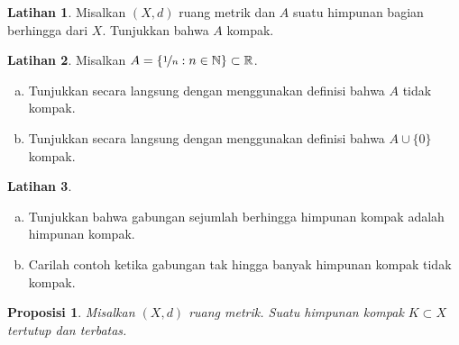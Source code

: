 \documentclass[12pt,openany]{book}
\newcommand{\R}{{\mathbb{R}}}
\newcommand{\N}{{\mathbb{N}}}
\theoremstyle{plain}
\newtheorem{prop}[thm]{Proposisi}
\theoremstyle{remark}
\theoremstyle{definition}
\newenvironment{exbox}{%
    \def\FrameCommand{\vrule width 1pt \relax\hspace{10pt}}%
    \MakeFramed{\advance\hsize-\width\FrameRestore}%
}{%
    \endMakeFramed
}
\newenvironment{exparts}{%
    \leavevmode\begin{enumerate}[a),noitemsep,topsep=0pt,parsep=0pt,partopsep=0pt]
}{%
    \end{enumerate}
}
\theoremstyle{exercise}
\newtheorem{exercise}{Latihan}[section]
\theoremstyle{example}
\begin{document}
\begin{exbox}
\begin{exercise}
Misalkan $(X,d)$ ruang metrik dan $A$ suatu himpunan bagian berhingga dari $X$.
Tunjukkan bahwa $A$ kompak.
\end{exercise}

\begin{exercise}
Misalkan $A = \{ \nicefrac{1}{n} : n \in \N \} \subset \R$.
\begin{exparts}
\item
Tunjukkan secara langsung dengan menggunakan definisi bahwa $A$
tidak kompak.
\item
Tunjukkan secara langsung dengan menggunakan definisi bahwa $A \cup \{ 0 \}$
kompak.
\end{exparts}
\end{exercise}

\begin{exercise}
\begin{exparts}
\item
Tunjukkan bahwa gabungan sejumlah berhingga himpunan kompak adalah himpunan kompak.
\item
Carilah contoh ketika gabungan tak hingga banyak himpunan kompak tidak
kompak.
\end{exparts}
\end{exercise}
\end{exbox}

\begin{prop}
Misalkan $(X,d)$ ruang metrik. Suatu himpunan kompak $K \subset X$ tertutup dan
terbatas.
\end{prop}
\end{document}
